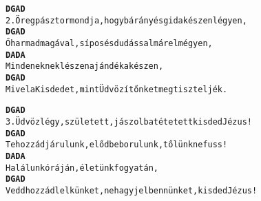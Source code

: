 \newpage
{}
\kottastart
{}
\kottaend
\begin{minipage}{\textwidth}
\begin{alltt}
\textbf{   D                     G                   A         D}
2. Öreg pásztor mondja, hogy bárány és gida készen légyen,
\textbf{   D                 G                 A        D}
   Ő harmadmagával, sípos és dudással már elmégyen,
\textbf{    D       A         D      A}
   Mindeneknek lészen ajándéka készen,
\textbf{    D                 G                 A         D}
   Mivel a Kisdedet, mint Üdvözítőnket megtiszteljék.
\end{alltt}
\vspace{0.0cm}
\versszakspacing
\end{minipage}
\begin{minipage}{\textwidth}
\begin{alltt}
\textbf{   D                      G                 A        D}
3. Üdvözlégy, született, jászolba tétetett kisded Jézus!
\textbf{    D                 G                 A         D}
   Tehozzád járulunk, elődbe borulunk, tőlünk ne fuss!
\textbf{    D       A       D        A}
   Halálunk óráján, életünk fogyatán,
\textbf{    D                       G                      A        D}
   Vedd hozzád lelkünket, ne hagyj el bennünket, kisded Jézus!
\end{alltt}
\vspace{0.0cm}
\versszakspacing
\end{minipage}
